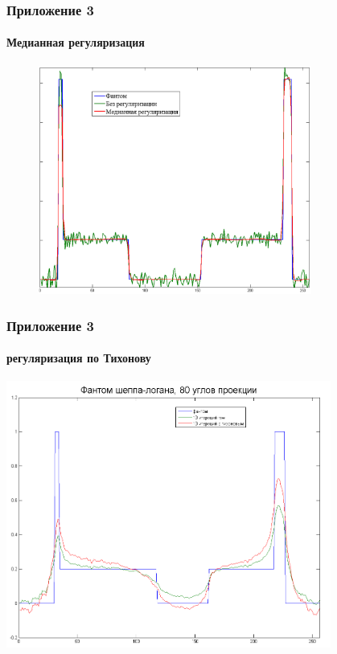 \documentclass[12pt]{beamer}
\begin{document}
\begin{frame}
\frametitle{Приложение 3}
\framesubtitle{Медианная регуляризация}

\begin{figure}
\includegraphics[width=0.8\textwidth]{slice_11}
\end{figure}

\end{frame}

\begin{frame}
\frametitle{Приложение 3}
\framesubtitle{регуляризация по Тихонову}
\includegraphics[width=0.8\textwidth]{tikhonov}
\end{frame}
\end{document}
